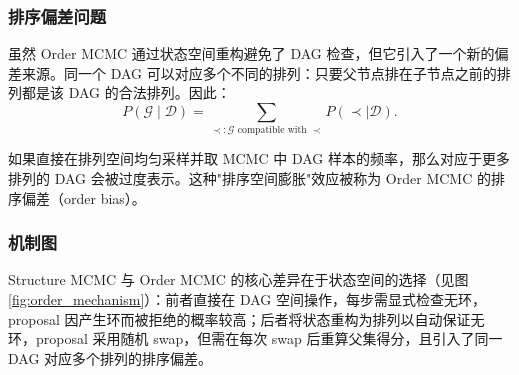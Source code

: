 \documentclass[UTF8,a4paper,12pt]{ctexart}
\newenvironment{algorithmic}[1][]{\begin{list}{}{\leftmargin=1.5em\itemsep=0.2em}}{\end{list}}
\newcommand{\Require}{\item[\textbf{输入:}]}
\newcommand{\Ensure}{\item[\textbf{输出:}]}
\newcommand{\State}{\item}
\newcommand{\If}[1]{\item \textbf{if} ##1 \textbf{then}}
\newcommand{\EndIf}{\item \textbf{end if}}
\newcommand{\For}[1]{\item \textbf{for} ##1 \textbf{do}}
\newcommand{\EndFor}{\item \textbf{end for}}
\begin{document}

\subsubsection{排序偏差问题}

虽然 Order MCMC 通过状态空间重构避免了 DAG 检查，但它引入了一个新的偏差来源。同一个 DAG 可以对应多个不同的排列：只要父节点排在子节点之前的排列都是该 DAG 的合法排列。因此：
\begin{equation}
P(\mathcal{G} \mid \mathcal{D}) = \sum_{\prec: \mathcal{G} \text{ compatible with } \prec} P(\prec \mid \mathcal{D}).
\end{equation}

如果直接在排列空间均匀采样并取 MCMC 中 DAG 样本的频率，那么对应于更多排列的 DAG 会被过度表示。这种"排序空间膨胀"效应被称为 Order MCMC 的排序偏差（order bias）。

\subsubsection{机制图}

Structure MCMC 与 Order MCMC 的核心差异在于状态空间的选择（见图 \ref{fig:order_mechanism}）：前者直接在 DAG 空间操作，每步需显式检查无环，proposal 因产生环而被拒绝的概率较高；后者将状态重构为排列以自动保证无环，proposal 采用随机 swap，但需在每次 swap 后重算父集得分，且引入了同一 DAG 对应多个排列的排序偏差。
\end{document}
